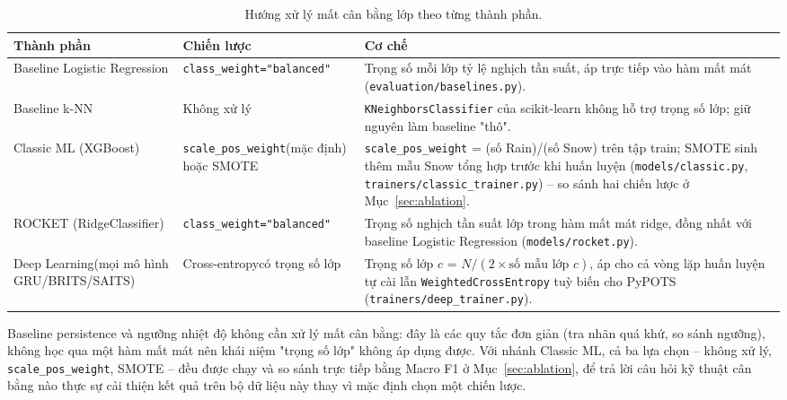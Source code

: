 \begin{table}[H]
\centering
\caption{Hướng xử lý mất cân bằng lớp theo từng thành phần.}
\label{tab:xu-ly-mat-can-bang}
\small
\begin{tabular}{@{}p{3.5cm}p{3.1cm}p{7.3cm}@{}}
\toprule
\textbf{Thành phần} & \textbf{Chiến lược} & \textbf{Cơ chế} \\
\midrule
Baseline Logistic Regression & \texttt{class\_weight}\newline\texttt{="balanced"} & Trọng số mỗi lớp tỷ lệ nghịch tần suất, áp trực tiếp vào hàm mất mát (\texttt{evaluation/baselines.py}). \\
\addlinespace
Baseline k-NN & Không xử lý & \texttt{KNeighborsClassifier} của scikit-learn không hỗ trợ trọng số lớp; giữ nguyên làm baseline "thô". \\
\addlinespace
Classic ML (XGBoost) & \texttt{scale\_pos\_weight}\newline (mặc định) hoặc SMOTE & \texttt{scale\_pos\_weight} = (số Rain)/(số Snow) trên tập train; SMOTE sinh thêm mẫu Snow tổng hợp trước khi huấn luyện (\texttt{models/classic.py}, \texttt{trainers/classic\_trainer.py}) -- so sánh hai chiến lược ở Mục~\ref{sec:ablation}. \\
\addlinespace
ROCKET (RidgeClassifier) & \texttt{class\_weight}\newline\texttt{="balanced"} & Trọng số nghịch tần suất lớp trong hàm mất mát ridge, đồng nhất với baseline Logistic Regression (\texttt{models/rocket.py}). \\
\addlinespace
Deep Learning\newline (mọi mô hình GRU/BRITS/SAITS) & Cross-entropy\newline có trọng số lớp & Trọng số lớp $c$ = $N / (2 \times \text{số mẫu lớp } c)$, áp cho cả vòng lặp huấn luyện tự cài lẫn \texttt{WeightedCrossEntropy} tuỳ biến cho PyPOTS (\texttt{trainers/deep\_trainer.py}). \\
\bottomrule
\end{tabular}
\end{table}

Baseline persistence và ngưỡng nhiệt độ không cần xử lý mất cân bằng: đây là các quy tắc
đơn giản (tra nhãn quá khứ, so sánh ngưỡng), không học qua một hàm mất mát nên khái niệm
"trọng số lớp" không áp dụng được. Với nhánh Classic ML, cả ba lựa chọn -- không xử lý,
\texttt{scale\_pos\_weight}, SMOTE -- đều được chạy và so sánh trực tiếp bằng Macro F1 ở
Mục~\ref{sec:ablation}, để trả lời câu hỏi kỹ thuật cân bằng nào thực sự cải thiện kết quả
trên bộ dữ liệu này thay vì mặc định chọn một chiến lược.

